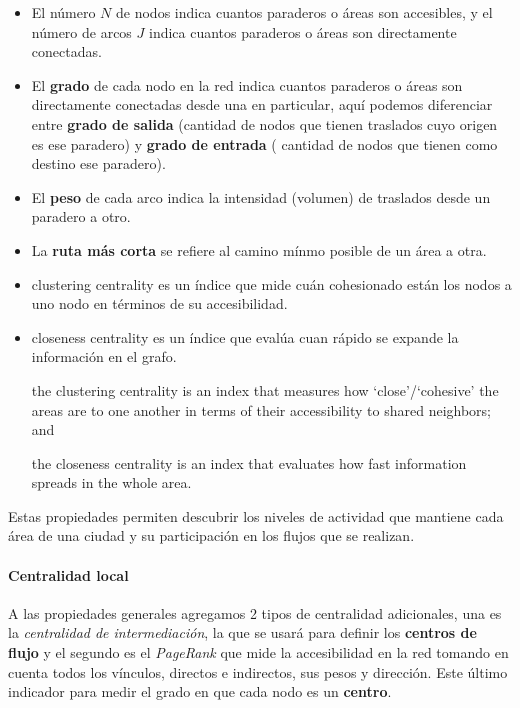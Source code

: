 \documentclass[12pt]{article}
\begin{document}
	\begin{itemize}
	
		\item El número $N$ de nodos indica cuantos paraderos o áreas son accesibles, y el número de arcos $J$ indica cuantos paraderos o áreas son directamente conectadas.
		\item El \textbf{grado} de cada nodo en la red indica cuantos paraderos o áreas son directamente conectadas desde una en particular, aquí podemos diferenciar entre \textbf{grado de salida} (cantidad de nodos que tienen traslados cuyo origen es ese paradero) y \textbf{grado de entrada} ( cantidad de nodos que tienen como destino ese paradero).
		
		\item El \textbf{peso} de cada arco indica la intensidad (volumen) de traslados desde un paradero a otro.
		
		\item La \textbf{ruta más corta} se refiere al camino mínmo posible de un área a otra.
		
		\item clustering centrality es un índice que mide cuán cohesionado están los nodos a uno nodo en términos de su accesibilidad.
		
		\item closeness centrality es un índice que evalúa cuan rápido se expande la información en el grafo.

 the clustering centrality is an index that measures how ‘close’/‘cohesive’ the areas
are to one another in terms of their accessibility to shared neighbors; and

 the closeness centrality is an index that evaluates how fast information spreads in
the whole area.
	\end{itemize}

Estas propiedades permiten descubrir los niveles de actividad que mantiene cada área de una ciudad y su participación en los flujos que se realizan.

	\paragraph{Centralidad local}
	
	A las propiedades generales agregamos 2 tipos de centralidad adicionales, una es la \textit{centralidad de intermediación}, la que se usará para definir los \textbf{centros de flujo} y el segundo es el \textit{PageRank} que mide la accesibilidad en la red tomando en cuenta todos los vínculos, directos e indirectos, sus pesos y dirección. Este último indicador para medir el grado en que cada nodo es un \textbf{centro}.
	
\end{document}
